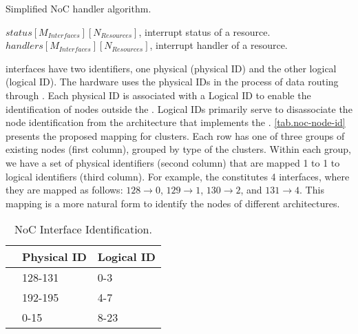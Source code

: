 			\begin{algorithm}[!tb]
				\caption{Simplified NoC handler algorithm.}%
				\label{alg.noc-handler}%
				\begin{algorithmic}[1]
					\Require $status[M_{Interfaces}][N_{Resources}]$, interrupt status of a resource.
					\Require $handlers[M_{Interfaces}][N_{Resources}]$, interrupt handler of a resource.
							\EndIf
						\EndFor
					\EndFor
					\EndProcedure
				\end{algorithmic}%
			\end{algorithm}

			\noc interfaces have two identifiers, one physical (physical ID) and the
			other logical (logical ID). The hardware uses the physical IDs in the
			process of data routing through \noc. Each physical ID is associated with
			a Logical ID to enable the identification of \noc nodes outside the \hal.
			Logical IDs primarily serve to disassociate the node identification from
			the architecture that implements the \hal. \autoref{tab.noc-node-id}
			presents the proposed mapping for \mppa clusters. Each row has one of
			three groups of existing \noc nodes (first column), grouped by type of
			the clusters. Within each group, we have a set of physical identifiers
			(second column) that are mapped 1 to 1 to logical identifiers (third column).
			For example, the  constitutes 4 \noc interfaces, where they are
			mapped as follows: $128 \to 0$, $129 \to 1$, $130 \to 2$, and $131 \to 4$.
			This mapping is a more natural form to identify the \noc nodes of
			different architectures.

			\begin{table}[!tb]
				\centering%
				\caption{NoC Interface Identification.}%
				\label{tab.noc-node-id}%

				\begin{tabular}{l|l|l|}
					\cline{2-3}
															   & \textbf{Physical ID} & \textbf{Logical ID} \\ \hline
					\multicolumn{1}{|l|}{\textbf{\iocluster0}} & 128-131              & 0-3                 \\ \hline
					\multicolumn{1}{|l|}{\textbf{\iocluster1}} & 192-195              & 4-7                 \\ \hline
					\multicolumn{1}{|l|}{\textbf{\cclusters}}  & 0-15                 & 8-23                \\ \hline
				\end{tabular}

			\end{table}

